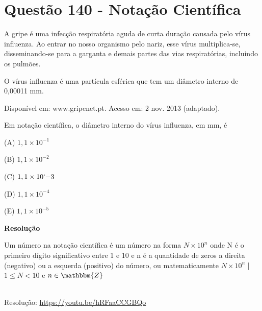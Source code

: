 \section{Questão 140 - Notação Científica}

A gripe é uma infecção respiratória aguda de curta duração causada pelo vírus influenza. Ao entrar no nosso organismo pelo nariz, esse vírus multiplica-se, disseminando-se para a garganta e demais partes das vias respiratórias, incluindo os pulmões. 

O vírus influenza é uma partícula esférica que tem um diâmetro interno de 0,00011 mm.

\begin{flushright}
    {\scriptsize Disponível em: www.gripenet.pt. Acesso em: 2 nov. 2013 (adaptado).}
\end{flushright}

Em notação científica, o diâmetro interno do vírus influenza, em mm, é

(A)  $ 1,1 \times 10^{-1} $

(B)  $ 1,1 \times 10^{-2} $

(C)  $ 1,1 \times 10`{-3} $

(D)  $ 1,1 \times 10^{-4} $

(E)  $ 1,1 \times 10^{-5} $

\textbf{Resolução}

Um número na notação científica é um número na forma $ N \times 10^{n} $ onde N é o primeiro dígito significativo entre 1 e 10 e n é a quantidade de zeros a direita (negativo) ou a esquerda (positivo) do número, ou matematicamente $ N \times 10^{n} $ | $1 \leqslant N < 10 $ e $n \in \mathbbm{Z} $




\begin{center}
    \href{https://youtu.be/hRFaaCCGBQo}{
    }\\
    {\scriptsize Resolução: \url{https://youtu.be/hRFaaCCGBQo}}
\end{center}